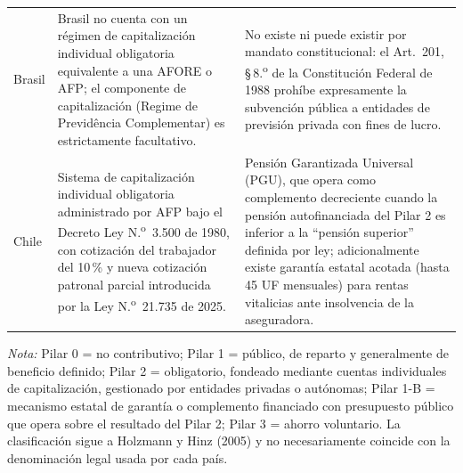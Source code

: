 \documentclass[12pt, letterpaper]{article}
\begin{document}
\begin{xltabular}{\textwidth}{P{2.1cm}Y Y}
Brasil &
Brasil no cuenta con un régimen de capitalización individual obligatoria equivalente a una AFORE o AFP; el componente de capitalización (Regime de Previdência Complementar) es estrictamente facultativo. &
No existe ni puede existir por mandato constitucional: el Art.\ 201, \S\,8.\textsuperscript{o} de la Constitución Federal de 1988 prohíbe expresamente la subvención pública a entidades de previsión privada con fines de lucro. \\

Chile &
Sistema de capitalización individual obligatoria administrado por AFP bajo el Decreto Ley N.\textsuperscript{o}~3.500 de 1980, con cotización del trabajador del 10\,\% y nueva cotización patronal parcial introducida por la Ley N.\textsuperscript{o}~21.735 de 2025. &
Pensión Garantizada Universal (PGU), que opera como complemento decreciente cuando la pensión autofinanciada del Pilar 2 es inferior a la ``pensión superior'' definida por ley; adicionalmente existe garantía estatal acotada (hasta 45 UF mensuales) para rentas vitalicias ante insolvencia de la aseguradora. \\

\end{xltabular}

\begin{small}
\noindent\textit{Nota:} Pilar 0 = no contributivo; Pilar 1 = público, de reparto y generalmente de beneficio definido; Pilar 2 = obligatorio, fondeado mediante cuentas individuales de capitalización, gestionado por entidades privadas o autónomas; Pilar 1-B = mecanismo estatal de garantía o complemento financiado con presupuesto público que opera sobre el resultado del Pilar 2; Pilar 3 = ahorro voluntario. La clasificación sigue a Holzmann y Hinz (2005) y no necesariamente coincide con la denominación legal usada por cada país.
\end{small}
\end{document}
